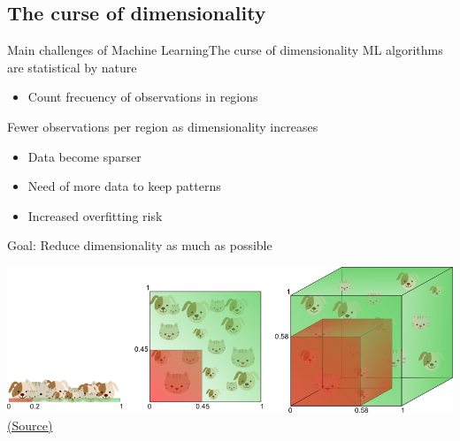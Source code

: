 \documentclass[10pt,compress]{beamer} %
\begin{document}
\subsection{The curse of dimensionality}
\begin{frame}{Main challenges of Machine Learning}{The curse of dimensionality}
	ML algorithms are statistical by nature
	\begin{itemize}
		\item Count frecuency of observations in regions
	\end{itemize}

	Fewer observations per region as dimensionality increases
	\begin{itemize}
		\item Data become sparser
		\item Need of more data to keep patterns
		\item Increased overfitting risk
	\end{itemize}
	Goal: Reduce dimensionality as much as possible 

	\begin{center}
	\includegraphics[width=0.8\linewidth]{figs/curseofdimensionality.png}\\
	\tiny{\href{http://www.visiondummy.com/2014/04/curse-dimensionality-affect-classification/}{(Source)}}
   	\end{center} 
\end{frame}
\end{document}
